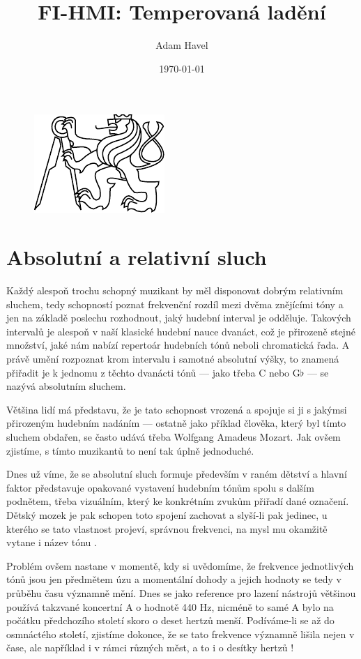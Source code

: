 \documentclass[12pt]{article}
\title{FI-HMI: Temperovaná ladění}
\date{\today}
\author{Adam Havel}
\begin{document}
\maketitle

\begin{figure}[h]\centering
	\includegraphics[width = .4 \textwidth]{cvut.pdf}
\end{figure}

\pagebreak

\section{Absolutní a relativní sluch}

Každý alespoň trochu schopný muzikant by měl disponovat dobrým relativním sluchem, tedy schopností poznat frekvenční rozdíl mezi dvěma znějícími tóny a jen na základě poslechu rozhodnout, jaký hudební interval je odděluje. Takových intervalů je alespoň v naší klasické hudební nauce dvanáct, což je přirozeně stejné množství, jaké nám nabízí repertoár hudebních tónů neboli chromatická řada. A právě umění rozpoznat krom intervalu i samotné absolutní výšky, to znamená přiřadit je k jednomu z těchto dvanácti tónů — jako třeba C nebo G$\flat$ — se nazývá absolutním sluchem.

Většina lidí má představu, že je tato schopnost vrozená a spojuje si ji s jakýmsi přirozeným hudebním nadáním — ostatně jako příklad člověka, který byl tímto sluchem obdařen, se často udává třeba Wolfgang Amadeus Mozart. Jak ovšem zjistíme, s tímto  muzikantů to není tak úplně jednoduché.

Dnes už víme, že se absolutní sluch formuje především v raném dětství a hlavní faktor představuje opakované vystavení hudebním tónům spolu s dalším podnětem, třeba vizuálním, který ke konkrétním zvukům přiřadí dané označení. Dětský mozek je pak schopen toto spojení zachovat a slyší-li pak jedinec, u kterého se tato vlastnost projeví, správnou frekvenci, na mysl mu okamžitě vytane i název tónu \cite{absolute_pitch}.

Problém ovšem nastane v momentě, kdy si uvědomíme, že frekvence jednotlivých tónů jsou jen předmětem úzu a momentální dohody a jejich hodnoty se tedy v průběhu času významně mění. Dnes se jako reference pro lazení nástrojů většinou používá takzvané koncertní A o hodnotě 440 Hz, nicméně to samé A bylo na počátku předchozího století skoro o deset hertzů menší. Podíváme-li se až do osmnáctého století, zjistíme dokonce, že se tato frekvence významně lišila nejen v čase, ale například i v rámci různých měst, a to i o desítky hertzů \cite{pitch}!
\end{document}
